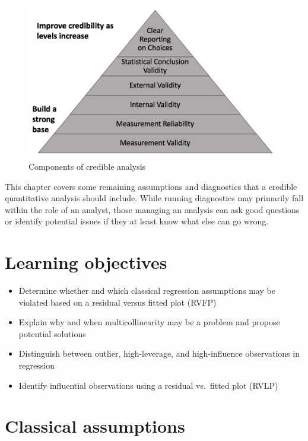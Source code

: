 \documentclass[
]{book}
\providecommand{\tightlist}{%
  \setlength{\itemsep}{0pt}\setlength{\parskip}{0pt}}
\newenvironment{learncheck}%
{%
  \par\vspace{\baselineskip}\noindent 
  \color{Exercise}\begin{itshape}%
  \par\vspace{\baselineskip}\noindent\ignorespaces 
}%
{%
  \end{itshape}\ignorespacesafterend 
}
\begin{document}
\begin{figure}
\includegraphics[width=13.58in]{images/credible} \caption{Components of credible analysis}\label{fig:credfigrepeat2}
\end{figure}

This chapter covers some remaining assumptions and diagnostics that a credible quantitative analysis should include. While running diagnostics may primarily fall within the role of an analyst, those managing an analysis can ask good questions or identify potential issues if they at least know what else can go wrong.

\hypertarget{lo13}{%
\section{Learning objectives}\label{lo13}}

\begin{learncheck}
\begin{itemize}
\tightlist
\item
  Determine whether and which classical regression assumptions may be
  violated based on a residual versus fitted plot (RVFP)
\item
  Explain why and when multicollinearity may be a problem and propose
  potential solutions
\item
  Distinguish between outlier, high-leverage, and high-influence
  observations in regression
\item
  Identify influential observations using a residual vs.~fitted plot
  (RVLP)
\end{itemize}
\end{learncheck}

\hypertarget{classical-assumptions}{%
\section{Classical assumptions}\label{classical-assumptions}}
\end{document}
